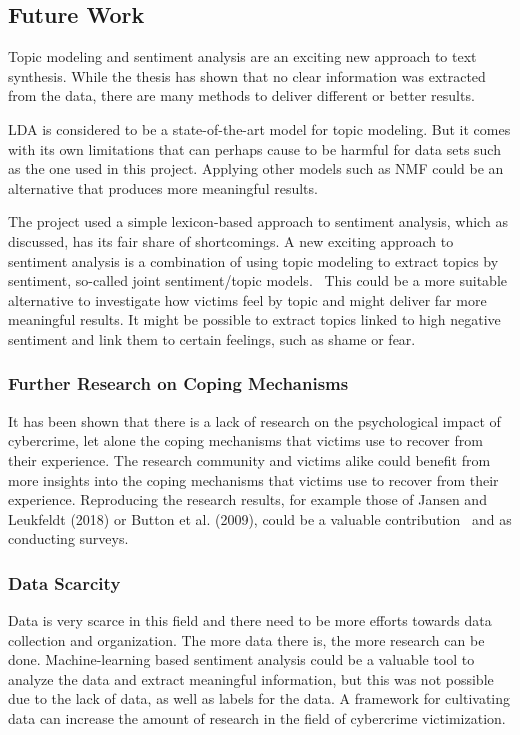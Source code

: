 \subsection{Future Work}

Topic modeling and sentiment analysis are an exciting new approach to text synthesis. While the thesis has shown that no clear information was extracted from the data, there are many methods to deliver different or better results.

LDA is considered to be a state-of-the-art model for topic modeling. But it comes with its own limitations that can perhaps cause to be harmful for data sets such as the one used in this project. Applying other models such as NMF could be an alternative that produces more meaningful results.

The project used a simple lexicon-based approach to sentiment analysis, which as discussed, has its fair share of shortcomings. A new exciting approach to sentiment analysis is a combination of using topic modeling to extract topics by sentiment, so-called joint sentiment/topic models.~\cite{lin2009joint} This could be a more suitable alternative to investigate how victims feel by topic and might deliver far more meaningful results. It might be possible to extract topics linked to high negative sentiment and link them to certain feelings, such as shame or fear.

\subsubsection*{Further Research on Coping Mechanisms}

It has been shown that there is a lack of research on the psychological impact of cybercrime, let alone the coping mechanisms that victims use to recover from their experience. The research community and victims alike could benefit from more insights into the coping mechanisms that victims use to recover from their experience. Reproducing the research results, for example those of Jansen and Leukfeldt (2018) or Button et al. (2009), could be a valuable contribution~\cite{jansen2018coping}\cite{button2009better} and as conducting surveys.

\subsubsection*{Data Scarcity}

Data is very scarce in this field and there need to be more efforts towards data collection and organization. The more data there is, the more research can be done. Machine-learning based sentiment analysis could be a valuable tool to analyze the data and extract meaningful information, but this was not possible due to the lack of data, as well as labels for the data. A framework for cultivating data can increase the amount of research in the field of cybercrime victimization.


